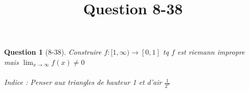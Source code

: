 \documentclass[a4paper,10pt]{article}
\title{Question 8-38}
\newtheorem*{question}{Question}
\begin{document}
\maketitle
\begin{question}[8-38]
 Construire $f:[1,\infty) \rightarrow [0,1]$ tq $f$ est riemann impropre mais $\lim_{x \to \infty} f(x) \not = 0$
 \\
 \\
 Indice : Penser aux triangles de hauteur 1 et d'air $\frac{1}{2^n}$
\end{question}
\end{document}
